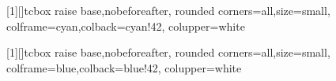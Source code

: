 \usepackage{tcolorbox}

\newtcbox{\langBox}[1][]{tcbox raise base,nobeforeafter,
  rounded corners=all,size=small,
  colframe=cyan,colback=cyan!42,
  colupper=white}

\newtcbox{\tagBox}[1][]{tcbox raise base,nobeforeafter,
  rounded corners=all,size=small,
  colframe=blue,colback=blue!42,
  colupper=white}

\newcommand{\langTag}[1]{\langBox{\uppercase{\scriptsize{#1}}}}
\newcommand{\disTag}[1]{\tagBox{\footnotesize{#1}}}
